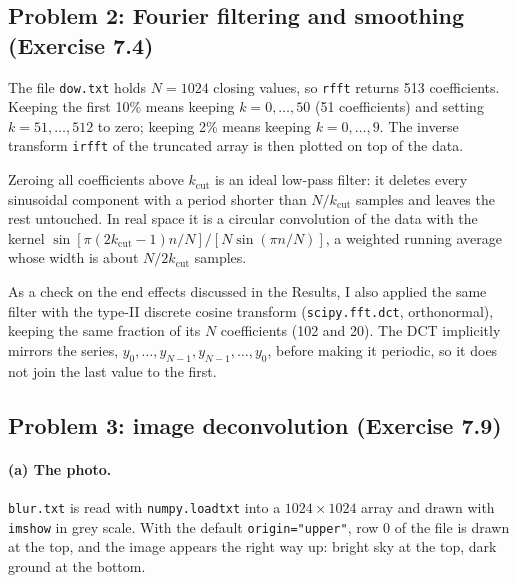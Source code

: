 \documentclass[11pt]{article}
\newcommand{\code}[1]{\texttt{#1}}
\begin{document}
\subsection*{Problem 2: Fourier filtering and smoothing (Exercise 7.4)}

The file \code{dow.txt} holds $N=1024$ closing values, so \code{rfft} returns
513 coefficients. Keeping the first 10\% means keeping $k = 0,\dots,50$ (51
coefficients) and setting $k=51,\dots,512$ to zero; keeping 2\% means keeping
$k=0,\dots,9$. The inverse transform \code{irfft} of the truncated array is
then plotted on top of the data.

Zeroing all coefficients above $k_{\mathrm{cut}}$ is an ideal low-pass filter:
it deletes every sinusoidal component with a period shorter than
$N/k_{\mathrm{cut}}$ samples and leaves the rest untouched. In real space it is
a circular convolution of the data with the kernel
$\sin[\pi(2k_{\mathrm{cut}}-1)n/N]/[N\sin(\pi n/N)]$, a weighted running
average whose width is about $N/2k_{\mathrm{cut}}$ samples.

As a check on the end effects discussed in the Results, I also applied the same
filter with the type-II discrete cosine transform (\code{scipy.fft.dct},
orthonormal), keeping the same fraction of its $N$ coefficients (102 and 20).
The DCT implicitly mirrors the series, $y_0,\dots,y_{N-1},y_{N-1},\dots,y_0$,
before making it periodic, so it does not join the last value to the first.

\subsection*{Problem 3: image deconvolution (Exercise 7.9)}

\paragraph{(a) The photo.}
\code{blur.txt} is read with \code{numpy.loadtxt} into a $1024\times1024$ array
and drawn with \code{imshow} in grey scale. With the default
\code{origin="upper"}, row 0 of the file is drawn at the top, and the image
appears the right way up: bright sky at the top, dark ground at the bottom.
\end{document}
